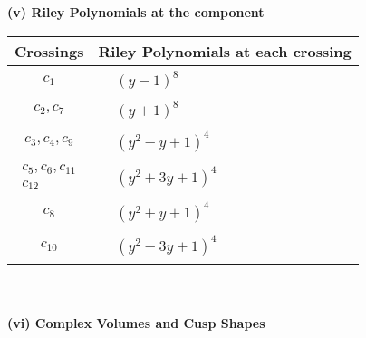 \documentclass[1p]{elsarticle_modified}
\theoremstyle{definition}
\begin{document}
\newpage\renewcommand{\arraystretch}{1}
\flushleft \textbf{(v) Riley Polynomials at the component}\newline \\
\begin{tabular}{m{50pt}|m{274pt}}
Crossings & \hspace{64pt}Riley Polynomials at each crossing \\
\hline $$\begin{aligned}c_{1}\end{aligned}$$&$\begin{aligned}
&(y-1)^8
\end{aligned}$\\
\hline $$\begin{aligned}c_{2},c_{7}\end{aligned}$$&$\begin{aligned}
&(y+1)^8
\end{aligned}$\\
\hline $$\begin{aligned}c_{3},c_{4},c_{9}\end{aligned}$$&$\begin{aligned}
&(y^2- y+1)^4
\end{aligned}$\\
\hline $$\begin{aligned}c_{5},c_{6},c_{11}\\c_{12}\end{aligned}$$&$\begin{aligned}
&(y^2+3 y+1)^4
\end{aligned}$\\
\hline $$\begin{aligned}c_{8}\end{aligned}$$&$\begin{aligned}
&(y^2+y+1)^4
\end{aligned}$\\
\hline $$\begin{aligned}c_{10}\end{aligned}$$&$\begin{aligned}
&(y^2-3 y+1)^4
\end{aligned}$\\
\hline
\end{tabular}\\~\\
\newpage\flushleft \textbf{(vi) Complex Volumes and Cusp Shapes}
\end{document}
